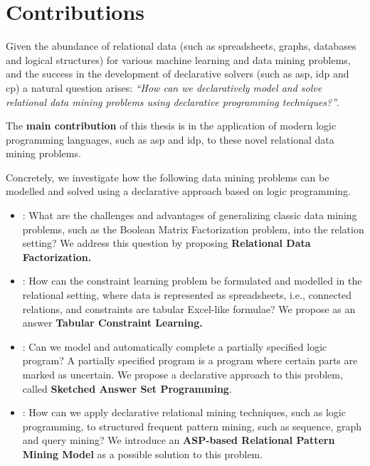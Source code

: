 \section{Contributions}\label{sec:contributions}
Given the abundance of relational data (such as spreadsheets, graphs,
databases and logical structures) for various machine learning and data
mining problems, and the success in the development of declarative solvers (such
as \acrshort{asp}, \acrshort{idp} and \acrshort{cp}) a
natural question arises: \textit{``How can we declaratively model and
solve relational data mining problems using declarative programming
techniques?''}. 

The \textbf{main contribution} of this thesis is in the application of
modern logic programming languages, such as \acrshort{asp} and
\acrshort{idp}, to these novel relational data mining problems.


Concretely, we investigate how the following data mining problems
can be modelled and solved using a declarative approach based on
logic programming.
\pubrev
\begin{itemize}
    \item \cone: What are the challenges and advantages of generalizing
    classic data mining problems, such as the Boolean Matrix
    Factorization problem, into the relation setting? We address this
        question by proposing \textbf{Relational Data Factorization.}
  \item \ctwo: How can the constraint learning problem be formulated
   and modelled in the relational setting, where data is
   represented as spreadsheets, i.e., connected relations, and constraints are
   tabular Excel-like formulae? We propose as an answer \textbf{Tabular Constraint Learning.} 
  \item \cthree: Can we model and automatically complete a partially specified logic program?
      A partially specified program is a program where certain
        parts are marked as uncertain. We propose a declarative approach to
        this problem, called \textbf{Sketched Answer Set Programming}.
   \item \cfour:
    How can we apply declarative relational mining
    techniques, such as logic programming, to structured frequent pattern mining, such as sequence, graph
    and query mining? We introduce an \textbf{ASP-based Relational
        Pattern Mining Model} as a possible solution to this problem.
\end{itemize}
\pubrevend

